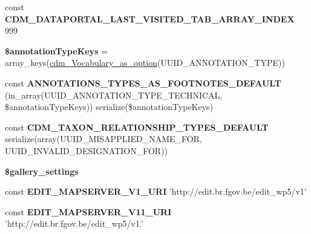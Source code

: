 \begin{DoxyCompactItemize}
\item 
\hypertarget{settings_8php_a69c245f235a67504e1552d59ad8bf906}{const {\bfseries C\-D\-M\-\_\-\-D\-A\-T\-A\-P\-O\-R\-T\-A\-L\-\_\-\-L\-A\-S\-T\-\_\-\-V\-I\-S\-I\-T\-E\-D\-\_\-\-T\-A\-B\-\_\-\-A\-R\-R\-A\-Y\-\_\-\-I\-N\-D\-E\-X} 999}\label{settings_8php_a69c245f235a67504e1552d59ad8bf906}

\item 
\hypertarget{settings_8php_aa04a4ca462bc68e54f0b2c1f94346a1c}{{\bfseries \$annotation\-Type\-Keys} = array\-\_\-keys(\hyperlink{cdm__api_8module_af45890cc79e537b562e586872c73b9f4}{cdm\-\_\-\-Vocabulary\-\_\-as\-\_\-option}(U\-U\-I\-D\-\_\-\-A\-N\-N\-O\-T\-A\-T\-I\-O\-N\-\_\-\-T\-Y\-P\-E))}\label{settings_8php_aa04a4ca462bc68e54f0b2c1f94346a1c}

\item 
\hypertarget{settings_8php_ac7ed6f3eb224dda97aeb0aecb24920e0}{const {\bfseries A\-N\-N\-O\-T\-A\-T\-I\-O\-N\-S\-\_\-\-T\-Y\-P\-E\-S\-\_\-\-A\-S\-\_\-\-F\-O\-O\-T\-N\-O\-T\-E\-S\-\_\-\-D\-E\-F\-A\-U\-L\-T} (in\-\_\-array(U\-U\-I\-D\-\_\-\-A\-N\-N\-O\-T\-A\-T\-I\-O\-N\-\_\-\-T\-Y\-P\-E\-\_\-\-T\-E\-C\-H\-N\-I\-C\-A\-L, \$annotation\-Type\-Keys)) serialize(\$annotation\-Type\-Keys)}\label{settings_8php_ac7ed6f3eb224dda97aeb0aecb24920e0}

\item 
\hypertarget{settings_8php_abe3788f418983b33a23c416b99b7ac01}{const {\bfseries C\-D\-M\-\_\-\-T\-A\-X\-O\-N\-\_\-\-R\-E\-L\-A\-T\-I\-O\-N\-S\-H\-I\-P\-\_\-\-T\-Y\-P\-E\-S\-\_\-\-D\-E\-F\-A\-U\-L\-T} serialize(array(U\-U\-I\-D\-\_\-\-M\-I\-S\-A\-P\-P\-L\-I\-E\-D\-\_\-\-N\-A\-M\-E\-\_\-\-F\-O\-R, U\-U\-I\-D\-\_\-\-I\-N\-V\-A\-L\-I\-D\-\_\-\-D\-E\-S\-I\-G\-N\-A\-T\-I\-O\-N\-\_\-\-F\-O\-R))}\label{settings_8php_abe3788f418983b33a23c416b99b7ac01}

\item 
{\bfseries \$gallery\-\_\-settings}
\item 
\hypertarget{settings_8php_a5934c7fca067e87fb985d9528fadd92c}{const {\bfseries E\-D\-I\-T\-\_\-\-M\-A\-P\-S\-E\-R\-V\-E\-R\-\_\-\-V1\-\_\-\-U\-R\-I} 'http\-://edit.\-br.\-fgov.\-be/edit\-\_\-wp5/v1'}\label{settings_8php_a5934c7fca067e87fb985d9528fadd92c}

\item 
\hypertarget{settings_8php_ae1b29d8a60d09990703eae7e4cc82fd4}{const {\bfseries E\-D\-I\-T\-\_\-\-M\-A\-P\-S\-E\-R\-V\-E\-R\-\_\-\-V11\-\_\-\-U\-R\-I} 'http\-://edit.\-br.\-fgov.\-be/edit\-\_\-wp5/v1.'}\label{settings_8php_ae1b29d8a60d09990703eae7e4cc82fd4}


\end{DoxyCompactItemize}
